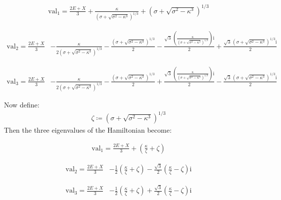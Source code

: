\documentclass[1pt]{book}
\theoremstyle{break}
\theoremstyle{break}
\begin{document}
\begin{align*}
\text{val}_1=\frac{2E+X}{3}+\frac{\kappa}{{\left(\sigma+\sqrt{\sigma^2-\kappa^3}\right)}^{1/3}}+{\left(\sigma+\sqrt{{\sigma}^2-{\kappa}^3}\right)}^{1/3}
\end{align*}

\begin{align*}
\text{val}_2=\frac{2E+X}{3}
&-\frac{\kappa}{2{\left(\sigma+\sqrt{{\sigma}^2-{\kappa}^3}\right)}^{1/3}}-\frac{{\left(\sigma+\sqrt{{\sigma}^2-{\kappa}^3}\right)}^{1/3}}{2}-\frac{\sqrt{3}\,\left(\frac{\kappa}{{\left(\sigma+\sqrt{{\sigma}^2-{\kappa}^3}\right)}^{1/3}} \right)\mathrm{i}}{2}+\frac{\sqrt{3}\,{\left(\sigma+\sqrt{{\sigma}^2-{\kappa}^3}\right)}^{1/3}{}\mathrm{i}}{2}
\end{align*}


\begin{align*}
\text{val}_3 = \frac{2E+X}{3}
&-\frac{\kappa}{2{\left(\sigma+\sqrt{{\sigma}^2-{\kappa}^3}\right)}^{1/3}}-\frac{{\left(\sigma+\sqrt{{\sigma}^2-{\kappa}^3}\right)}^{1/3}}{2}+\frac{\sqrt{3}\,\left(\frac{\kappa}{{\left(\sigma+\sqrt{{\sigma}^2-{\kappa}^3}\right)}^{1/3}}\right)\mathrm{i}}{2}-\frac{\sqrt{3}\,{\left(\sigma+\sqrt{{\sigma}^2-{\kappa}^3}\right)}^{1/3}\mathrm{i}}{2} 
\end{align*}

\hfill\break
\hfill\break
${}$\qquad Now define:
\begin{align*}
\zeta \coloneqq {\left(\sigma+\sqrt{\sigma^2-\kappa^3}\right)}^{1/3}
\end{align*}
${}$\qquad Then the three eigenvalues of the Hamiltonian become:


\begin{align*}
\text{val}_1=\frac{2E+X}{3}+\left(\frac{\kappa}{\zeta}+\zeta\right)
\end{align*}

\begin{align*}
\text{val}_2= \frac{2E+X}{3}
&-\frac{1}{2}\left(\frac{\kappa}{\zeta}+\zeta\right)-\frac{\sqrt{3}}{2}\left(\frac{\kappa}{\zeta}-\zeta\right)\mathrm{i} 
\end{align*}


\begin{align*}
\text{val}_3 = \frac{2E+X}{3}
&-\frac{1}{2}\left(\frac{\kappa}{\zeta}+\zeta\right)+\frac{\sqrt{3}}{2}\left(\frac{\kappa}{\zeta}-\zeta\right)\mathrm{i} 
\end{align*}
\end{document}

